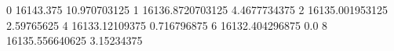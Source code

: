 0 16143.375 10.970703125
1 16136.8720703125 4.4677734375
2 16135.001953125 2.59765625
4 16133.12109375 0.716796875
6 16132.404296875 0.0
8 16135.556640625 3.15234375
